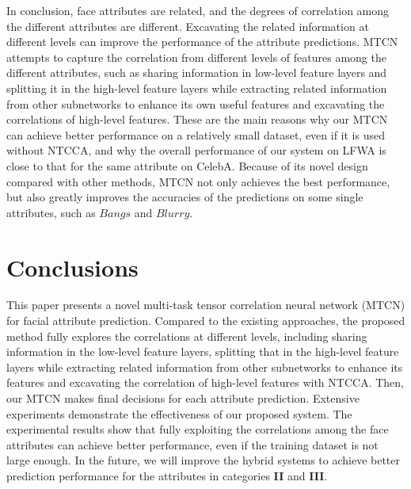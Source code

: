 \documentclass{sig-alternate-05-2015}
\begin{document}
In conclusion, face attributes are related, and the degrees of correlation among the different attributes are different. Excavating the related information at different levels can improve the performance of the attribute predictions. MTCN attempts to capture the correlation from different levels of features among the different attributes, such as sharing information in low-level feature layers and splitting it in the high-level feature layers while extracting related information from other subnetworks to enhance its own useful features and excavating the correlations of high-level features. These are the main reasons why our MTCN can achieve better performance on a relatively small dataset, even if it is used without NTCCA, and why the overall performance of our system on LFWA is close to that for the same attribute on CelebA. Because of its novel design compared with other methods, MTCN not only achieves the best performance, but also greatly improves the accuracies of the predictions on some single attributes, such as $Bangs$ and $Blurry$.








\section{Conclusions}

This paper presents a novel multi-task tensor correlation neural network (MTCN) for facial attribute prediction. Compared to the existing approaches, the proposed method fully explores the correlations at different levels, including sharing information in the low-level feature layers, splitting that in the high-level feature layers while extracting related information from other subnetworks to enhance its features and excavating the correlation of high-level features with NTCCA. Then, our MTCN makes final decisions for each attribute prediction. Extensive experiments demonstrate the effectiveness of our proposed system. The experimental results show that fully exploiting the correlations among the face attributes can achieve better performance, even if the training dataset is not large enough. In the future, we will improve the hybrid systems to achieve better prediction performance for the attributes in categories \textbf{II} and \textbf{III}.



\end{document}
